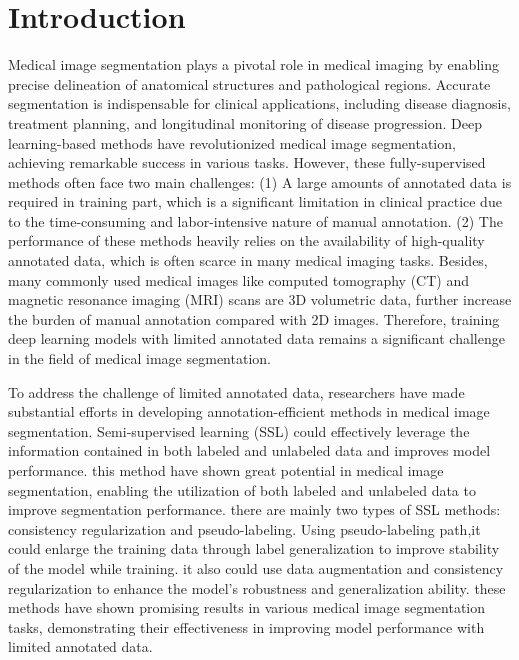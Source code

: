 \documentclass[sn-mathphys-num]{sn-jnl}
\theoremstyle{thmstyleone}%
\theoremstyle{thmstyletwo}%
\theoremstyle{thmstylethree}%
\begin{document}

\maketitle

\section{Introduction}\label{sec1}
Medical image segmentation plays a pivotal role in medical imaging by enabling precise delineation of anatomical structures and pathological regions.  
Accurate segmentation is indispensable for clinical applications, including disease diagnosis, treatment planning, and longitudinal monitoring of disease progression.  
Deep learning-based methods have revolutionized medical image segmentation, achieving remarkable success in various tasks.
However, these fully-supervised methods often face two main challenges:
(1) A large amounts of annotated data is required in training part, which is a significant limitation in clinical practice due to the time-consuming and labor-intensive nature of manual annotation.
(2) The performance of these methods heavily relies on the availability of high-quality annotated data, which is often scarce in many medical imaging tasks.
Besides, many commonly used medical images like computed tomography (CT) and magnetic resonance imaging (MRI) scans are 3D volumetric data, further increase the burden of manual annotation compared with 2D images.
Therefore, training deep learning models with limited annotated data remains a significant challenge in the field of medical image segmentation.

To address the challenge of limited annotated data, researchers have made substantial efforts in developing annotation-efficient methods in medical image segmentation.
Semi-supervised learning (SSL) could effectively leverage the information contained in both labeled and unlabeled data and improves model performance.
this method have shown great potential in medical image segmentation, enabling the utilization of both labeled and unlabeled data to improve segmentation performance.
there are mainly two types of SSL methods: consistency regularization and pseudo-labeling.
Using pseudo-labeling path,it could enlarge the training data through label generalization to improve stability of the model while training.
it also could use data augmentation and consistency regularization to enhance the model's robustness and generalization ability.
these methods have shown promising results in various medical image segmentation tasks, demonstrating their effectiveness in improving model performance with limited annotated data.
\end{document}
